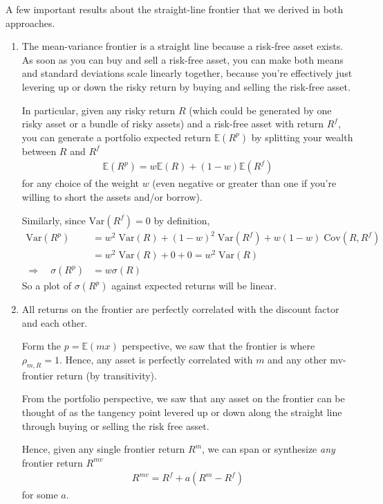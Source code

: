 \documentclass[12pt]{article}
\theoremstyle{plain}
\theoremstyle{definition}
\theoremstyle{remark}
\begin{document}
A few important results about the straight-line frontier that we derived
in both approaches.
\begin{enumerate}
  \item The mean-variance frontier is a straight line because a
    risk-free asset exists. As soon as you can buy and sell a risk-free
    asset, you can make both means and standard deviations scale
    linearly together, because you're effectively just levering up or
    down the risky return by buying and selling the risk-free asset.

    In particular, given any risky return $R$ (which could be generated
    by one risky asset or a bundle of risky assets) and a risk-free
    asset with return $R^f$, you can generate a portfolio expected
    return $\mathbb{E}(R^p)$ by splitting your wealth between $R$ and
    $R^f$
    \begin{align*}
      \mathbb{E}(R^p) = w \mathbb{E}(R) + (1-w) \mathbb{E}(R^f)
    \end{align*}
    for any choice of the weight $w$ (even negative or greater than one
    if you're willing to short the assets and/or borrow).

    Similarly, since $\text{Var}(R^f)=0$ by definition,
    \begin{align*}
      \text{Var}(R^p)
      &= w^2 \; \text{Var}(R) + (1-w)^2 \; \text{Var}(R^f)
      + w(1-w)\; \text{Cov}(R,R^f)\\
      &= w^2 \; \text{Var}(R) + 0 + 0 = w^2\;\text{Var}(R)\\
      \Rightarrow \quad
      \sigma(R^p) &= w \sigma(R)
    \end{align*}
    So a plot of $\sigma(R^p)$ against expected returns will be linear.

  \item All returns on the frontier are perfectly correlated with the
    discount factor and each other.

    Form the $p=\mathbb{E}(mx)$ perspective, we saw that the frontier is
    where $\rho_{m,R}=1$. Hence, any asset is perfectly correlated with
    $m$ and any other mv-frontier return (by transitivity).

    From the portfolio perspective, we saw that any asset on the
    frontier can be thought of as the tangency point levered up or down
    along the straight line through buying or selling the risk free
    asset.

    Hence, given any single frontier return $R^m$, we can span or
    synthesize \emph{any} frontier return $R^{mv}$
    \begin{align*}
      R^{mv} = R^f + a(R^m-R^f)
    \end{align*}
    for some $a$.


\end{enumerate}
\end{document}
